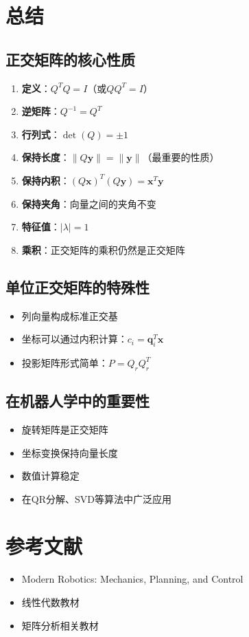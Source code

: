 \documentclass[12pt,a4paper]{article}
\begin{document}
\section{总结}

\subsection{正交矩阵的核心性质}

\begin{enumerate}
\item \textbf{定义}：$Q^T Q = I$（或$Q Q^T = I$）
\item \textbf{逆矩阵}：$Q^{-1} = Q^T$
\item \textbf{行列式}：$\det(Q) = \pm 1$
\item \textbf{保持长度}：$\|Q\bm{y}\| = \|\bm{y}\|$（最重要的性质）
\item \textbf{保持内积}：$(Q\bm{x})^T (Q\bm{y}) = \bm{x}^T \bm{y}$
\item \textbf{保持夹角}：向量之间的夹角不变
\item \textbf{特征值}：$|\lambda| = 1$
\item \textbf{乘积}：正交矩阵的乘积仍然是正交矩阵
\end{enumerate}

\subsection{单位正交矩阵的特殊性}

\begin{itemize}
\item 列向量构成标准正交基
\item 坐标可以通过内积计算：$c_i = \bm{q}_i^T \bm{x}$
\item 投影矩阵形式简单：$P = Q_r Q_r^T$
\end{itemize}

\subsection{在机器人学中的重要性}

\begin{itemize}
\item 旋转矩阵是正交矩阵
\item 坐标变换保持向量长度
\item 数值计算稳定
\item 在QR分解、SVD等算法中广泛应用
\end{itemize}

\section{参考文献}

\begin{itemize}
\item Modern Robotics: Mechanics, Planning, and Control
\item 线性代数教材
\item 矩阵分析相关教材
\end{itemize}
\end{document}
